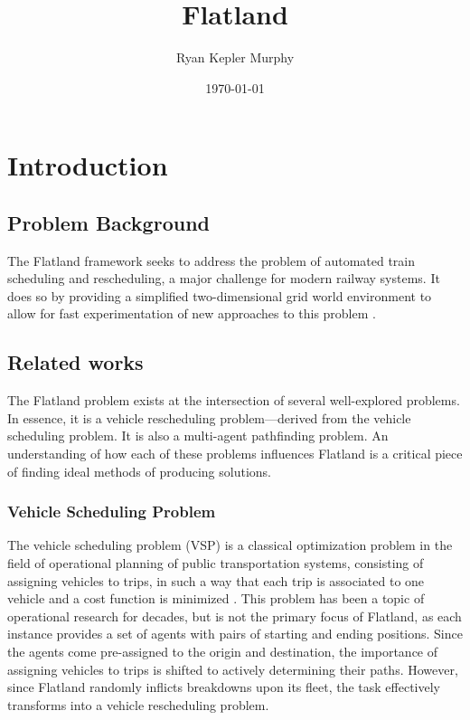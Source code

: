 \documentclass[11pt]{article}
\title{Flatland}
\author{Ryan Kepler Murphy}
\date{\today}
\begin{document}
\maketitle	
\pagebreak

\tableofcontents
\pagebreak


\section{Introduction}
\subsection{Problem Background}
The Flatland framework seeks to address the problem of automated train scheduling and rescheduling, a major challenge
for modern railway systems. It does so by providing a simplified two-dimensional grid world environment to allow for fast experimentation of new approaches to this problem \cite{monylascscbhwaegeibavistsasp20a}. 

\subsection{Related works}
The Flatland problem exists at the intersection of several well-explored problems.  In essence, it is a vehicle rescheduling problem—derived from the vehicle scheduling problem.  It is also a multi-agent pathfinding problem.  An understanding of how each of these problems influences Flatland is a critical piece of finding ideal methods of producing solutions.

\subsubsection{Vehicle Scheduling Problem}
The vehicle scheduling problem (VSP) is a classical optimization problem in the field of operational planning of public transportation systems, consisting of assigning vehicles to trips, in such a way that each trip is associated to one vehicle and a cost function is minimized \cite{bapeukfa00a}.  This problem has been a topic of operational research for decades, but is not the primary focus of Flatland, as each instance provides a set of agents with pairs of starting and ending positions. Since the agents come pre-assigned to the origin and destination, the importance of assigning vehicles to trips is shifted to actively determining their paths.  However, since Flatland randomly inflicts breakdowns upon its fleet, the task effectively transforms into a vehicle rescheduling problem.
\end{document}
